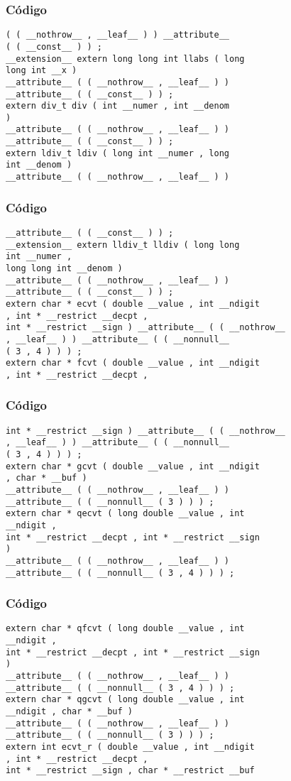 \documentclass{beamer}
\begin{document}
\begin{frame}[fragile]
\frametitle{C\'odigo}
\begin{verbatim}
( ( __nothrow__ , __leaf__ ) ) __attribute__ 
( ( __const__ ) ) ; 
__extension__ extern long long int llabs ( long 
long int __x ) 
__attribute__ ( ( __nothrow__ , __leaf__ ) ) 
__attribute__ ( ( __const__ ) ) ; 
extern div_t div ( int __numer , int __denom 
) 
__attribute__ ( ( __nothrow__ , __leaf__ ) ) 
__attribute__ ( ( __const__ ) ) ; 
extern ldiv_t ldiv ( long int __numer , long 
int __denom ) 
__attribute__ ( ( __nothrow__ , __leaf__ ) ) 
\end{verbatim}
\end{frame}
\begin{frame}[fragile]
\frametitle{C\'odigo}
\begin{verbatim}
__attribute__ ( ( __const__ ) ) ; 
__extension__ extern lldiv_t lldiv ( long long 
int __numer , 
long long int __denom ) 
__attribute__ ( ( __nothrow__ , __leaf__ ) ) 
__attribute__ ( ( __const__ ) ) ; 
extern char * ecvt ( double __value , int __ndigit 
, int * __restrict __decpt , 
int * __restrict __sign ) __attribute__ ( ( __nothrow__ 
, __leaf__ ) ) __attribute__ ( ( __nonnull__ 
( 3 , 4 ) ) ) ; 
extern char * fcvt ( double __value , int __ndigit 
, int * __restrict __decpt , 
\end{verbatim}
\end{frame}
\begin{frame}[fragile]
\frametitle{C\'odigo}
\begin{verbatim}
int * __restrict __sign ) __attribute__ ( ( __nothrow__ 
, __leaf__ ) ) __attribute__ ( ( __nonnull__ 
( 3 , 4 ) ) ) ; 
extern char * gcvt ( double __value , int __ndigit 
, char * __buf ) 
__attribute__ ( ( __nothrow__ , __leaf__ ) ) 
__attribute__ ( ( __nonnull__ ( 3 ) ) ) ; 
extern char * qecvt ( long double __value , int 
__ndigit , 
int * __restrict __decpt , int * __restrict __sign 
) 
__attribute__ ( ( __nothrow__ , __leaf__ ) ) 
__attribute__ ( ( __nonnull__ ( 3 , 4 ) ) ) ; 
\end{verbatim}
\end{frame}
\begin{frame}[fragile]
\frametitle{C\'odigo}
\begin{verbatim}
extern char * qfcvt ( long double __value , int 
__ndigit , 
int * __restrict __decpt , int * __restrict __sign 
) 
__attribute__ ( ( __nothrow__ , __leaf__ ) ) 
__attribute__ ( ( __nonnull__ ( 3 , 4 ) ) ) ; 
extern char * qgcvt ( long double __value , int 
__ndigit , char * __buf ) 
__attribute__ ( ( __nothrow__ , __leaf__ ) ) 
__attribute__ ( ( __nonnull__ ( 3 ) ) ) ; 
extern int ecvt_r ( double __value , int __ndigit 
, int * __restrict __decpt , 
int * __restrict __sign , char * __restrict __buf 
\end{verbatim}
\end{frame}
\end{document}

